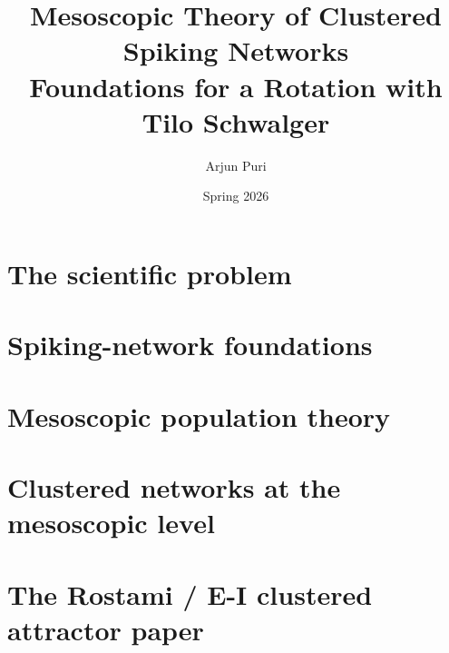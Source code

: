 \documentclass{coursenotes}
\title{Mesoscopic Theory of Clustered Spiking Networks\\[0.5em]
  \large Foundations for a Rotation with Tilo Schwalger}
\author{Arjun Puri}
\date{Spring 2026}
\begin{document}
\frontmatter
{}
\hypersetup{pageanchor=false}

\hypersetup{pageanchor=true}
\tableofcontents



\mainmatter
\clearpage
{}

\part{The scientific problem}



\part{Spiking-network foundations}




\part{Mesoscopic population theory}





\part{Clustered networks at the mesoscopic level}




\part{The Rostami / E-I clustered attractor paper}



\end{document}
